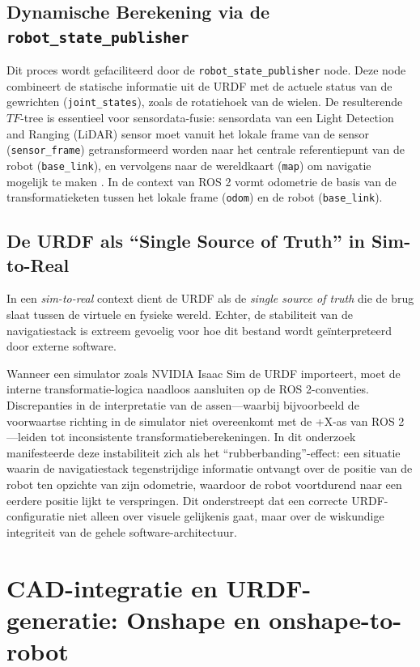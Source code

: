 \subsection{Dynamische Berekening via de \texttt{robot\_state\_publisher}}
Dit proces wordt gefaciliteerd door de \texttt{robot\_state\_publisher} node. Deze node combineert de statische informatie uit de URDF met de actuele status van de gewrichten (\texttt{joint\_states}), zoals de rotatiehoek van de wielen. De resulterende $TF$-tree is essentieel voor sensordata-fusie: sensordata van een Light Detection and Ranging (LiDAR) sensor moet vanuit het lokale frame van de sensor (\texttt{sensor\_frame}) getransformeerd worden naar het centrale referentiepunt van de robot (\texttt{base\_link}), en vervolgens naar de wereldkaart (\texttt{map}) om navigatie mogelijk te maken \autocite{Quigley2015}.
In de context van ROS 2 vormt odometrie de basis van de transformatieketen tussen het lokale frame (\texttt{odom}) en de robot (\texttt{base\_link}).
\subsection{De URDF als ``Single Source of Truth'' in Sim-to-Real}
In een \textit{sim-to-real} context dient de URDF als de \textit{single source of truth} die de brug slaat tussen de virtuele en fysieke wereld. Echter, de stabiliteit van de navigatiestack is extreem gevoelig voor hoe dit bestand wordt geïnterpreteerd door externe software.

Wanneer een simulator zoals NVIDIA Isaac Sim de URDF importeert, moet de interne transformatie-logica naadloos aansluiten op de ROS 2-conventies. Discrepanties in de interpretatie van de assen—waarbij bijvoorbeeld de voorwaartse richting in de simulator niet overeenkomt met de +X-as van ROS 2—leiden tot inconsistente transformatieberekeningen. In dit onderzoek manifesteerde deze instabiliteit zich als het ``rubberbanding''-effect: een situatie waarin de navigatiestack tegenstrijdige informatie ontvangt over de positie van de robot ten opzichte van zijn odometrie, waardoor de robot voortdurend naar een eerdere positie lijkt te verspringen. Dit onderstreept dat een correcte URDF-configuratie niet alleen over visuele gelijkenis gaat, maar over de wiskundige integriteit van de gehele software-architectuur.

\section{CAD-integratie en URDF-generatie: Onshape en onshape-to-robot}
\label{sec:onshape_to_robot}

